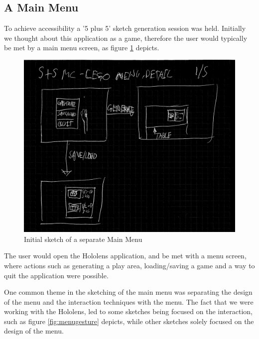 \subsection{A Main Menu}
To achieve accessibility a '5 plus 5' sketch generation session was held. Initially we thought about this application as a game, therefore the user would typically be met by a main menu screen, as figure \ref{fig:menu8} depicts.
\begin{figure}[t]
	\centering
	\includegraphics[width=0.7\linewidth]{figures/Menu/menu8}
	\caption{Initial sketch of a separate Main Menu}
	\label{fig:menu8}
\end{figure}
The user would open the Hololens application, and be met with a menu screen, where actions such as generating a play area, loading/saving a game and a way to quit the application were possible. \par
One common theme in the sketching of the main menu was separating the design of the menu and the interaction techniques with the menu. The fact that we were working with the Hololens, led to some sketches being focused on the interaction, such as figure \ref{fig:menugesture} depicts,  while other sketches solely focused on the design of the menu.\par
